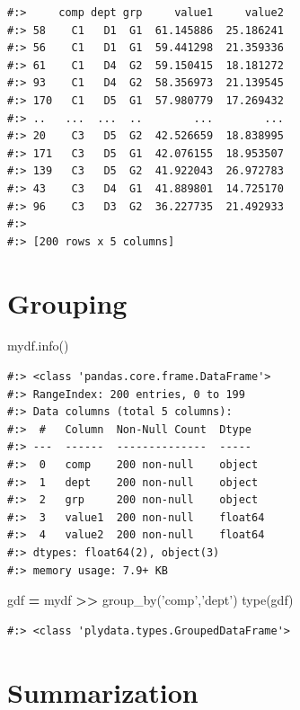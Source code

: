 \documentclass[
]{book}
\newenvironment{Shaded}{\begin{snugshade}}{\end{snugshade}}
\newcommand{\BuiltInTok}[1]{#1}
\newcommand{\NormalTok}[1]{#1}
\newcommand{\OperatorTok}[1]{\textcolor[rgb]{0.43,0.43,0.43}{\textbf{#1}}}
\newcommand{\StringTok}[1]{\textcolor[rgb]{0.5,0.5,0.5}{#1}}
\begin{document}
\begin{verbatim}
#:>     comp dept grp     value1     value2
#:> 58    C1   D1  G1  61.145886  25.186241
#:> 56    C1   D1  G1  59.441298  21.359336
#:> 61    C1   D4  G2  59.150415  18.181272
#:> 93    C1   D4  G2  58.356973  21.139545
#:> 170   C1   D5  G1  57.980779  17.269432
#:> ..   ...  ...  ..        ...        ...
#:> 20    C3   D5  G2  42.526659  18.838995
#:> 171   C3   D5  G1  42.076155  18.953507
#:> 139   C3   D5  G2  41.922043  26.972783
#:> 43    C3   D4  G1  41.889801  14.725170
#:> 96    C3   D3  G2  36.227735  21.492933
#:> 
#:> [200 rows x 5 columns]
\end{verbatim}

\hypertarget{grouping}{%
\section{Grouping}\label{grouping}}

\begin{Shaded}
\begin{Highlighting}[]
\NormalTok{mydf.info()}
\end{Highlighting}
\end{Shaded}

\begin{verbatim}
#:> <class 'pandas.core.frame.DataFrame'>
#:> RangeIndex: 200 entries, 0 to 199
#:> Data columns (total 5 columns):
#:>  #   Column  Non-Null Count  Dtype  
#:> ---  ------  --------------  -----  
#:>  0   comp    200 non-null    object 
#:>  1   dept    200 non-null    object 
#:>  2   grp     200 non-null    object 
#:>  3   value1  200 non-null    float64
#:>  4   value2  200 non-null    float64
#:> dtypes: float64(2), object(3)
#:> memory usage: 7.9+ KB
\end{verbatim}

\begin{Shaded}
\begin{Highlighting}[]
\NormalTok{gdf }\OperatorTok{=}\NormalTok{ mydf }\OperatorTok{>>}\NormalTok{ group_by(}\StringTok{'comp'}\NormalTok{,}\StringTok{'dept'}\NormalTok{)}
\BuiltInTok{type}\NormalTok{(gdf)}
\end{Highlighting}
\end{Shaded}

\begin{verbatim}
#:> <class 'plydata.types.GroupedDataFrame'>
\end{verbatim}

\hypertarget{summarization}{%
\section{Summarization}\label{summarization}}
\end{document}
